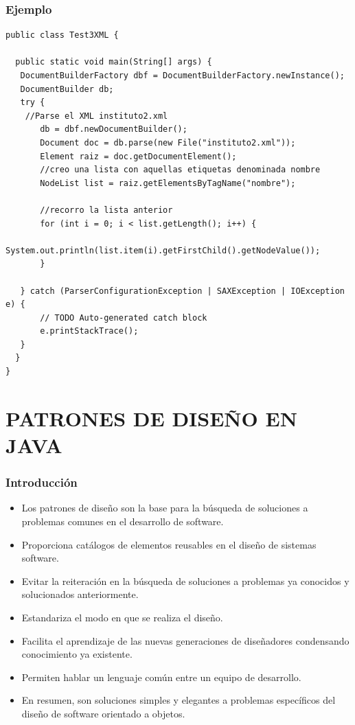 \documentclass{beamer}
\begin{document}
\begin{frame}[fragile]
\frametitle{Ejemplo}
\begin{scriptsize}
\begin{verbatim}
public class Test3XML {

  public static void main(String[] args) {
   DocumentBuilderFactory dbf = DocumentBuilderFactory.newInstance();
   DocumentBuilder db;
   try {
    //Parse el XML instituto2.xml
       db = dbf.newDocumentBuilder();
       Document doc = db.parse(new File("instituto2.xml"));
       Element raiz = doc.getDocumentElement();
       //creo una lista con aquellas etiquetas denominada nombre
       NodeList list = raiz.getElementsByTagName("nombre");

       //recorro la lista anterior 
       for (int i = 0; i < list.getLength(); i++) {
         System.out.println(list.item(i).getFirstChild().getNodeValue());
       }
			
   } catch (ParserConfigurationException | SAXException | IOException e) {
       // TODO Auto-generated catch block
       e.printStackTrace();
   } 
  }
}
\end{verbatim}
\end{scriptsize}
\end{frame}

\section{PATRONES DE DISEÑO EN JAVA}
\begin{frame}
\frametitle{Introducción}
\begin{itemize}[<+->]
\item Los patrones de diseño son la base para la búsqueda de soluciones a problemas comunes en el desarrollo de software.
\item Proporciona catálogos de elementos reusables en el diseño de sistemas software.
\item Evitar la reiteración en la búsqueda de soluciones a problemas ya conocidos y solucionados anteriormente.
\item Estandariza el modo en que se realiza el diseño.
\item Facilita el aprendizaje de las nuevas generaciones de diseñadores condensando conocimiento ya existente.
\item Permiten hablar un lenguaje común entre un equipo de desarrollo.
\item En resumen, son soluciones simples y elegantes a problemas específicos del diseño de software orientado a objetos.
\end{itemize}
\end{frame}
\end{document}
